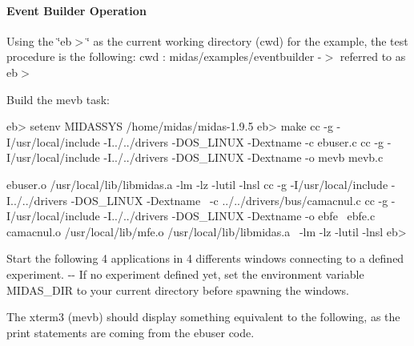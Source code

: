 \hypertarget{FE_Event_Builder_FE_eb_Operation}{}\paragraph{Event Builder Operation}\label{FE_Event_Builder_FE_eb_Operation}
Using the \char`\"{}eb$>$\char`\"{} as the current working directory (cwd) for the example, the test procedure is the following: cwd : midas/examples/eventbuilder -\/$>$ referred to as eb$>$


\begin{DoxyItemize}
\item Build the mevb task: 
\begin{DoxyCode}
eb> setenv MIDASSYS /home/midas/midas-1.9.5
eb> make
cc  -g -I/usr/local/include -I../../drivers -DOS_LINUX -Dextname -c ebuser.c
cc  -g -I/usr/local/include -I../../drivers -DOS_LINUX -Dextname -o mevb mevb.c \
      
          ebuser.o /usr/local/lib/libmidas.a  -lm -lz -lutil -lnsl
cc  -g -I/usr/local/include -I../../drivers -DOS_LINUX -Dextname \
          -c ../../drivers/bus/camacnul.c
cc  -g -I/usr/local/include -I../../drivers -DOS_LINUX -Dextname -o ebfe \
        ebfe.c camacnul.o /usr/local/lib/mfe.o /usr/local/lib/libmidas.a \
        -lm -lz -lutil -lnsl
eb>
\end{DoxyCode}

\item Start the following 4 applications in 4 differents windows connecting to a defined experiment. -\/-\/ If no experiment defined yet, set the environment variable MIDAS\_\-DIR to your current directory before spawning the windows. 

\end{DoxyItemize}


\begin{DoxyItemize}
\item The xterm3 (mevb) should display something equivalent to the following, as the print statements are coming from the ebuser code.
\end{DoxyItemize}


